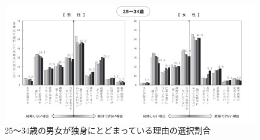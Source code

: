 \documentclass[12pt]{ltjsarticle}
\begin{document}
\begin{figure}[h]
\centering
 \includegraphics[width=170mm]{bannkonnriyuu.jpg}
 \caption{25～34歳の男女が独身にとどまっている理由の選択割合}
 \label{fig:dokusin}
\end{figure}





\end{document}
